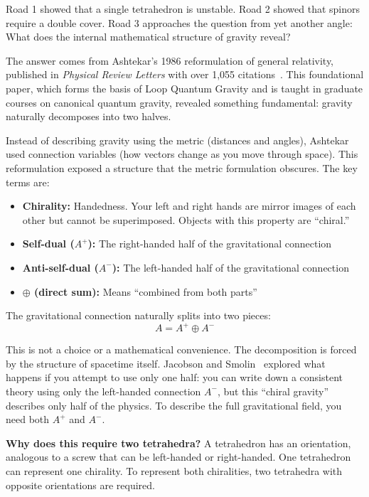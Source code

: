 \documentclass[aps,prd,preprint,superscriptaddress,showpacs,preprintnumbers,amsmath,amssymb,nofootinbib]{revtex4-2}
\begin{document}
Road 1 showed that a single tetrahedron is unstable. Road 2 showed that spinors require a double cover. Road 3 approaches the question from yet another angle: What does the internal mathematical structure of gravity reveal?

The answer comes from Ashtekar's 1986 reformulation of general relativity, published in \emph{Physical Review Letters} with over 1,055 citations~\cite{ashtekar1986}. This foundational paper, which forms the basis of Loop Quantum Gravity and is taught in graduate courses on canonical quantum gravity, revealed something fundamental: gravity naturally decomposes into two halves.

Instead of describing gravity using the metric (distances and angles), Ashtekar used connection variables (how vectors change as you move through space). This reformulation exposed a structure that the metric formulation obscures. The key terms are:

\begin{itemize}
\item \textbf{Chirality:} Handedness. Your left and right hands are mirror images of each other but cannot be superimposed. Objects with this property are ``chiral.''
\item \textbf{Self-dual ($A^+$):} The right-handed half of the gravitational connection
\item \textbf{Anti-self-dual ($A^-$):} The left-handed half of the gravitational connection
\item \textbf{$\oplus$ (direct sum):} Means ``combined from both parts''
\end{itemize}

The gravitational connection naturally splits into two pieces:
\begin{equation}
A = A^+ \oplus A^-
\end{equation}

This is not a choice or a mathematical convenience. The decomposition is forced by the structure of spacetime itself. Jacobson and Smolin~\cite{jacobson1987} explored what happens if you attempt to use only one half: you can write down a consistent theory using only the left-handed connection $A^-$, but this ``chiral gravity'' describes only half of the physics. To describe the full gravitational field, you need both $A^+$ and $A^-$.

\textbf{Why does this require two tetrahedra?} A tetrahedron has an orientation, analogous to a screw that can be left-handed or right-handed. One tetrahedron can represent one chirality. To represent both chiralities, two tetrahedra with opposite orientations are required.
\end{document}
